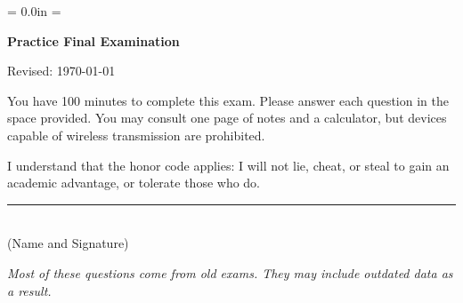 \documentclass[letterpaper,12pt]{article}
\def\HeadName{Practice Final Examination}
\begin{document}
\parindent = 0.0in
\parskip = \bigskipamount
\thispagestyle{empty}%
\Head

\centerline{\large \bf \HeadName}%
\centerline{Revised:  \today}

\bigskip
You have 100 minutes to complete this exam.  Please answer each
question in the space provided. You may consult one page of notes
and a calculator, but devices capable of wireless transmission are
prohibited.

I understand that the honor code applies: I will not lie, cheat,
or steal to gain an academic advantage, or tolerate those who do.

\begin{flushright}
\rule{4in}{0.5pt} \\ (Name and Signature)
\end{flushright}

{\it Most of these questions come from old exams.
They may include outdated data as a result. }
\end{document}
